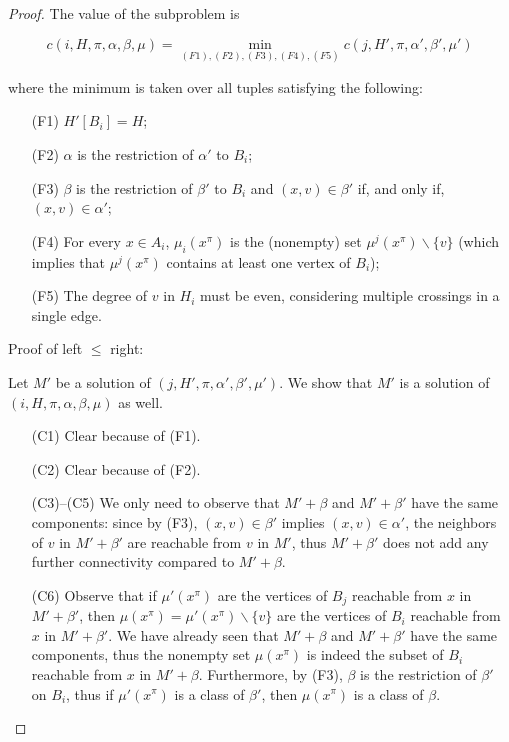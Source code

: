 \begin{proof}
The value of the subproblem is

$$c(i, H, \pi, \alpha, \beta, \mu) = \min_{(F1), (F2), (F3), (F4), (F5)} c(j, H', \pi, \alpha', \beta', \mu')$$

where the minimum is taken over all tuples satisfying the following:

\begin{itemize}
    \item[(F1)] \(H'[B_i] = H\);
    \item[(F2)] \(\alpha\) is the restriction of \(\alpha'\) to \(B_i\);
    \item[(F3)] \(\beta\) is the restriction of \(\beta'\) to \(B_i\) and \((x, v) \in \beta'\) if, and only if, \((x, v) \in \alpha'\);
    \item[(F4)] For every \(x \in A_i\), \(\mu_i(x^\pi)\) is the (nonempty) set \(\mu^j(x^\pi) \backslash \{v\}\) (which implies that \(\mu^j(x^\pi)\) contains at least one vertex of \(B_i\));
    \item[(F5)] The degree of \(v\) in \(H_i\) must be even, considering multiple crossings in a single edge.

\end{itemize}

Proof of left \(\leq\) right:

Let \(M'\) be a solution of \((j, H', \pi, \alpha', \beta', \mu')\). We show that \(M'\) is a solution of \((i, H, \pi, \alpha, \beta, \mu)\) as well.

\begin{itemize}
    \item[(C1)] Clear because of (F1).
    \item[(C2)] Clear because of (F2).
    \item[(C3)–(C5)] We only need to observe that \(M' + \beta\) and \(M' + \beta'\) have the same components: since by (F3), \((x, v) \in \beta'\) implies \((x, v) \in \alpha'\), the neighbors of \(v\) in \(M' + \beta'\) are reachable from \(v\) in \(M'\), thus \(M' + \beta'\) does not add any further connectivity compared to \(M' + \beta\).
    \item[(C6)] Observe that if \(\mu'(x^\pi)\) are the vertices of \(B_j\) reachable from \(x\) in \(M' + \beta'\), then \(\mu(x^\pi) = \mu'(x^\pi) \backslash \{v\}\) are the vertices of \(B_i\) reachable from \(x\) in \(M' + \beta'\). We have already seen that \(M' + \beta\) and \(M' + \beta'\) have the same components, thus the nonempty set \(\mu(x^\pi)\) is indeed the subset of \(B_i\) reachable from \(x\) in \(M' + \beta\). Furthermore, by (F3), \(\beta\) is the restriction of \(\beta'\) on \(B_i\), thus if \(\mu'(x^\pi)\) is a class of \(\beta'\), then \(\mu(x^\pi)\) is a class of \(\beta\).
\end{itemize}


\end{proof}
